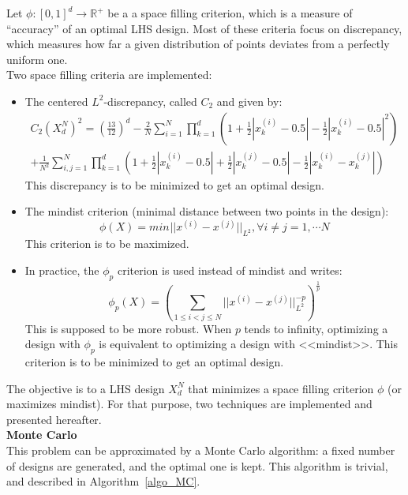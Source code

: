 {Let $\phi : [0,1]^d \rightarrow \mathbb{R}^{+}$ be a a space filling criterion, which is a measure of ``accuracy'' of an optimal LHS design. 
Most of these criteria focus on discrepancy, which measures how far a given distribution of points deviates from a perfectly uniform one.\\
Two space filling criteria are implemented:
\begin{itemize}
 \item The centered $L^2$-discrepancy, called $C_2$ and given by:
\begin{multline}\label{c2_dev}
C_2(X_{d}^N)^2 = \left(\frac{13}{12}\right)^{d} - \frac{2}{N} \sum_{i=1}^{N} \prod_{k=1}^{d} \left( 1 + \frac{1}{2} |x_k^{(i)} - 0.5| - \frac{1}{2} |x_k^{(i)} - 0.5|^2 \right)\\
             + \frac{1}{N^2} \sum_{i,j=1}^{N} \prod_{k=1}^{d} \left( 1 + \frac{1}{2} |x_k^{(i)} - 0.5| + \frac{1}{2} |x_k^{(j)} - 0.5| - \frac{1}{2} |x_k^{(i)} - x_k^{(j)}| \right)
\end{multline}
 This discrepancy is to be minimized to get an optimal design.
 \item The mindist criterion (minimal distance between two points in the design):
 \begin{equation}
  \phi(X) = min_{} ||x^{(i)} - x^{(j)} ||_{L^2}, \forall i\neq j=1,\cdots N
 \end{equation}
 This criterion is to be maximized.
 \item In practice, the $\phi_p$ criterion is used instead of mindist and writes:
 \begin{equation}
  \phi_p(X) = \left( \sum_{1\leq i < j \leq N} ||x^{(i)} - x^{(j)}||^{-p}_{L^2} \right)^{\frac{1}{p}}
 \end{equation}
This is supposed to be more robust. When $p$ tends to infinity, optimizing a design with $\phi_p$ is equivalent to optimizing a design with <<mindist>>. This criterion is to be minimized to get an optimal
design.
\end{itemize}

The objective is to a LHS design $X_{d}^{N}$ that minimizes a space filling criterion $\phi$ (or maximizes mindist). For that purpose, two techniques are implemented and presented
hereafter.\\

{\textbf{Monte Carlo}}\\
This problem can be approximated by a Monte Carlo algorithm: a fixed number of designs are generated, and the optimal one is kept. This algorithm is trivial, and described
in Algorithm~\ref{algo_MC}.

}
